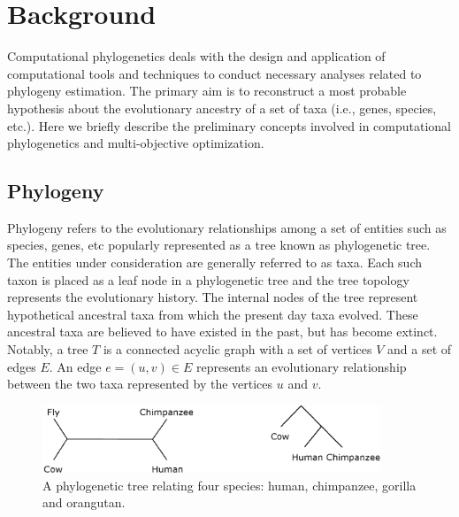 \chapter{Background}
\label{ch:background}



\graphicspath{{snoga/}}
Computational phylogenetics deals with the design and application of computational tools and techniques to conduct necessary analyses related to phylogeny estimation. The primary aim is to reconstruct a most probable hypothesis about the evolutionary ancestry of a set of taxa (i.e., genes, species, etc.). Here we briefly describe the preliminary concepts involved in computational phylogenetics and multi-objective optimization. 
\section{Phylogeny}
Phylogeny refers to the evolutionary relationships among a set of entities such as species, genes, etc popularly represented as a tree known as phylogenetic tree. The entities under consideration are generally referred to as taxa. Each such taxon is placed as a leaf node in a phylogenetic tree and the tree topology represents the evolutionary history. The  internal nodes of the tree represent hypothetical ancestral taxa from which the present day taxa evolved. These ancestral taxa are believed to have existed in the past, but has become extinct. Notably, a tree $T$ is a connected acyclic graph with a set of vertices $V$ and a set of edges $E$. An edge $e = (u, v) \in E$ represents an evolutionary relationship between the two taxa represented by the vertices $u$ and $v$. 

\begin{figure}[!htbp]
\centering
\includegraphics[width=0.9\textwidth]{Figure/outgroup.eps}
\caption{A phylogenetic tree relating four species: human, chimpanzee, gorilla and orangutan. }
\label{fig:outgroup}
\end{figure}

